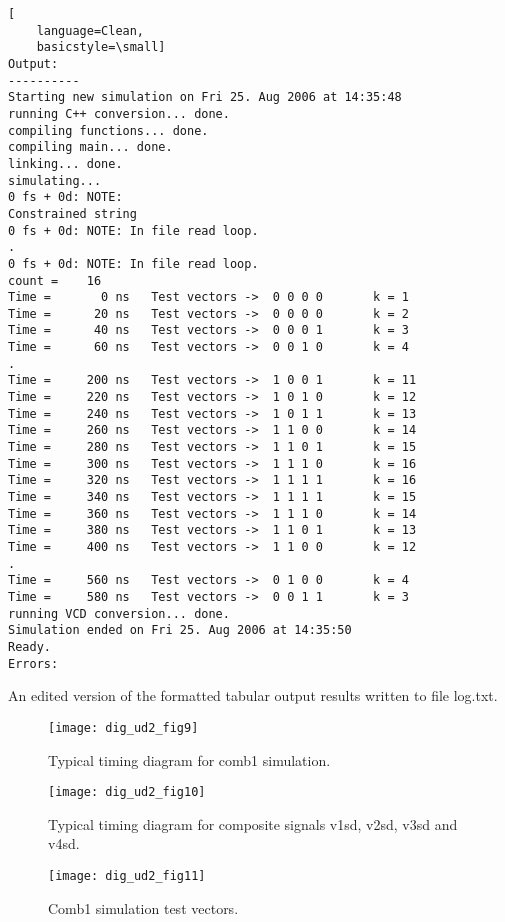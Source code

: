 \begin{table}
\begin{lstlisting}[
    language=Clean,
    basicstyle=\small]
Output:
----------
Starting new simulation on Fri 25. Aug 2006 at 14:35:48 
running C++ conversion... done. 
compiling functions... done. 
compiling main... done. 
linking... done. 
simulating... 
0 fs + 0d: NOTE: 
Constrained string
0 fs + 0d: NOTE: In file read loop. 
.
0 fs + 0d: NOTE: In file read loop. 
count =    16 
Time =       0 ns   Test vectors ->  0 0 0 0       k = 1 
Time =      20 ns   Test vectors ->  0 0 0 0       k = 2 
Time =      40 ns   Test vectors ->  0 0 0 1       k = 3 
Time =      60 ns   Test vectors ->  0 0 1 0       k = 4 
.
Time =     200 ns   Test vectors ->  1 0 0 1       k = 11 
Time =     220 ns   Test vectors ->  1 0 1 0       k = 12 
Time =     240 ns   Test vectors ->  1 0 1 1       k = 13 
Time =     260 ns   Test vectors ->  1 1 0 0       k = 14 
Time =     280 ns   Test vectors ->  1 1 0 1       k = 15 
Time =     300 ns   Test vectors ->  1 1 1 0       k = 16 
Time =     320 ns   Test vectors ->  1 1 1 1       k = 16 
Time =     340 ns   Test vectors ->  1 1 1 1       k = 15 
Time =     360 ns   Test vectors ->  1 1 1 0       k = 14 
Time =     380 ns   Test vectors ->  1 1 0 1       k = 13 
Time =     400 ns   Test vectors ->  1 1 0 0       k = 12  
.
Time =     560 ns   Test vectors ->  0 1 0 0       k = 4 
Time =     580 ns   Test vectors ->  0 0 1 1       k = 3 
running VCD conversion... done. 
Simulation ended on Fri 25. Aug 2006 at 14:35:50 
Ready. 
Errors:
\end{lstlisting}
\caption{An edited version of the formatted tabular output results written to file log.txt.}
\label{tab:tab9}
\end{table}
  

\begin{figure}[ht]   
  \centering 
  \texttt{[image: dig\_ud2\_fig9]}  
  \caption{Typical timing diagram for comb1 simulation.} 
  \label{fig:ud2_fig9} 
\end{figure} 



\begin{figure}[ht]   
  \centering 
  \texttt{[image: dig\_ud2\_fig10]}  
  \caption{Typical timing diagram for composite signals v1sd, v2sd, v3sd and v4sd.} 
  \label{fig:ud2_fig10} 
\end{figure} 


\FloatBarrier   
\begin{figure}[ht]   
  \centering 
  \texttt{[image: dig\_ud2\_fig11]}  
  \caption{Comb1 simulation test vectors.} 
  \label{fig:ud2_fig11} 
\end{figure}  

